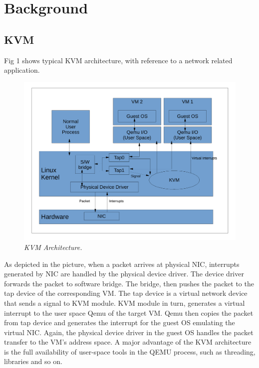 \section{Background} \label{sec:background}

\subsection{KVM} \label{sec:kvm}

Fig 1 shows typical KVM architecture, with reference to a network related
application. 

\begin{figure}[t]
\centering
\includegraphics[width=.47\textwidth]{figures/kvm}
\vspace{-.2in}
\caption{{\em KVM Architecture.}} \label{fig:kvm}
\vspace{.05in}
\end{figure}

As depicted in the picture, when a packet arrives at physical NIC,
interrupts generated by NIC are handled by the physical device driver. The device
driver forwards the packet to software bridge. The bridge, then pushes the packet
to the tap device of the corresponding VM. The tap device is a virtual network
device that sends a signal to KVM module. KVM module in turn, generates a virtual
interrupt to the user space Qemu of the target VM. Qemu then copies the packet from
tap device and generates the interrupt for the guest OS emulating the virtual NIC.
Again, the physical device driver in the guest OS handles the packet transfer to
the VM’s address space. A major advantage of the KVM architecture is the full
availability of user-space tools in the QEMU process, such as threading, libraries
and so on.

\subsection{\paxos}\label{sec:paxos}

